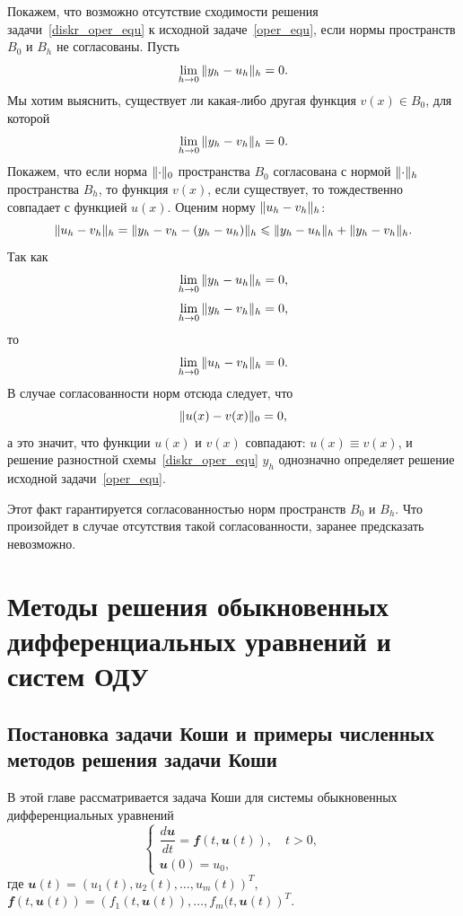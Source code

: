 \documentclass[11pt,a4paper,twoside]{report}
\numberwithin{equation}{section}
\theoremstyle{definition}
\theoremstyle{plain}
\DeclarePairedDelimiter\norm{\lVert}{\rVert}
\newcommand{\vfunc}[1]{\mathbfit{#1}}
\begin{document}
Покажем, что возможно отсутствие сходимости решения
задачи~\eqref{diskr_oper_equ} к исходной задаче~\eqref{oper_equ}, если нормы
пространств $B_0$ и $B_h$ не согласованы.
Пусть
%
$$
    \lim_{h\rightarrow0}{\norm{y_h-u_h}_h}=0.
$$
%
Мы хотим выяснить, существует ли какая-либо другая функция $v(x)\in B_0$, для которой
%
$$
    \lim_{h\rightarrow0}{\norm{y_h-v_h}_h}=0.
$$
%
Покажем, что если норма $\norm{\cdot}_0$ пространства $B_0$ согласована
с нормой $\norm{\cdot}_h$ пространства $B_h$, то функция $v(x)$, если существует,
то тождественно совпадает с
функцией $u(x)$.
Оценим норму $\norm{u_h-v_h}_h$:
%
$$
    \norm{u_h-v_h}_h=\norm{y_h-v_h-(y_h-u_h)}_h\leqslant \norm{y_h-u_h}_h
    +\norm{y_h-v_h}_h.
$$
%
Так как
%
$$
    \lim_{h\rightarrow0}{\norm{y_h-u_h}_h} = 0,
$$
%
%
$$
    \lim_{h\rightarrow0}{\norm{y_h-v_h}_h} = 0,
$$
%
то
%
$$
    \lim_{h\rightarrow0}{\norm{u_h-v_h}_h} = 0.
$$
%
В случае согласованности норм отсюда следует, что
%
$$
    \norm{u(x) - v(x)}_0 = 0,
$$
%
а это значит, что функции $u(x)$ и $v(x)$ совпадают: $u(x)\equiv v(x)$,
и решение разностной схемы~\eqref{diskr_oper_equ} $y_h$ однозначно определяет
решение исходной задачи~\eqref{oper_equ}.

Этот факт гарантируется согласованностью норм пространств $B_0$ и $B_h$.
Что произойдет в случае отсутствия такой согласованности, заранее предсказать невозможно.
%
\newpage
%
%
\chapter{Методы решения обыкновенных дифференциальных уравнений и систем ОДУ}
%
%
\section[Постановка задачи Коши и численные методы ее решения]{Постановка задачи Коши и примеры численных методов решения задачи Коши}
%
В этой главе рассматривается задача Коши для системы обыкновенных дифференциальных
уравнений
\begin{equation}
%
    \label{Koshi_sys}
    \begin{cases}
        \dfrac{d\vfunc{u}}{dt} = \vfunc{f}(t, \vfunc{u}(t)), \quad t > 0, \\
        \vfunc{u}(0) = u_0,
    \end{cases}
\end{equation}
%
где
$\vfunc{u}(t) = \left(u_1(t), u_2(t), \dots, u_m(t)\right)^T$,
~~$\vfunc{f}(t, \vfunc{u}(t)) = \left(f_1(t, \vfunc{u}(t)), \dots, f_m(t,\vfunc{u}(t)\right)^T$.
\end{document}

